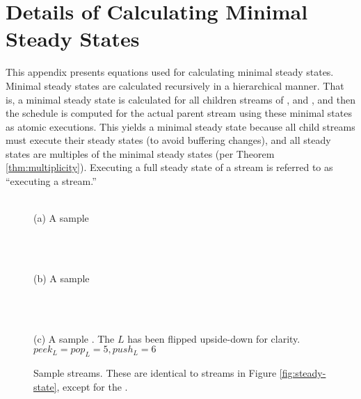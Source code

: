 \section{Details of Calculating Minimal Steady States}
\label{apx:eqs}

This appendix presents equations used for calculating minimal
steady states.  Minimal steady states are calculated recursively
in a hierarchical manner. That is, a minimal steady state is
calculated for all children streams of {\pipeline}, {\splitjoin}
and {{\feedbackloop}}, and then the schedule is computed for the
actual parent stream using these minimal states as atomic
executions. This yields a minimal steady state because all child
streams must execute their steady states (to avoid buffering
changes), and all steady states are multiples of the minimal
steady states (per Theorem \ref{thm:multiplicity}).  Executing a
full steady state of a stream is referred to as ``executing a
stream.''

\begin{figure}
\begin{center}

\begin{minipage}{1.5in}
\centering {} \\
{\protect\small (a) A sample {\pipeline}}
\end{minipage}
~
\begin{minipage}{1.5in}
\centering {} \\
{\protect\small (b) A sample {\splitjoin}}
\end{minipage}
~
\begin{minipage}{2in}
\centering {} \\
{\protect\small (c) A sample {{\feedbackloop}}.  The $L$ {\filter}
has been flipped upside-down for clarity.\\$peek_L = pop_L = 5,
push_L = 6$}
\end{minipage}

\caption{Sample {\StreamIt} streams. These are identical to
streams in Figure \ref{fig:steady-state}, except for the
{\pipeline}.} \label{fig:app:steady-state}

\end{center}
\end{figure}

\subsection{\filter}

